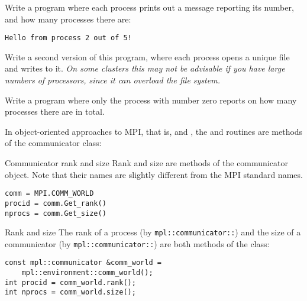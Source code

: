 \begin{exercise}
  \label{ex:hello3}
  Write a program where each process prints out a message
  reporting its number, and how many processes there are:
\begin{verbatim}
Hello from process 2 out of 5!
\end{verbatim}

  Write a second version of this program, where each process opens a
  unique file and writes to it. \emph{On some clusters this may not be
    advisable if you have large numbers of processors, since it can
    overload the file system.}
\end{exercise}
\begin{exercise}
  \label{ex:hello4}
  Write a program where only the process with number zero
  reports on how many processes there are in total.
\end{exercise}

In object-oriented approaches to MPI,
that is,  and ,
the  and 
routines are methods of the communicator class:

\begin{pythonnote}{Communicator rank and size}
  Rank and size are methods of the communicator object.
  Note that their names are slightly different from the MPI standard names.
\begin{lstlisting}
comm = MPI.COMM_WORLD
procid = comm.Get_rank()
nprocs = comm.Get_size()
\end{lstlisting}
\end{pythonnote}

\begin{mplnote}{Rank and size}
  The rank of a process (by \lstinline+mpl::communicator::+) and
  the size of a communicator (by \lstinline+mpl::communicator::+)
  are both methods of the  class:
\begin{lstlisting}
const mpl::communicator &comm_world =
    mpl::environment::comm_world();
int procid = comm_world.rank();
int nprocs = comm_world.size();
\end{lstlisting}
\end{mplnote}
